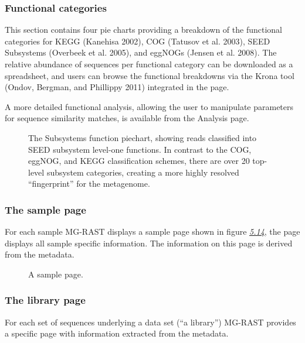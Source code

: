 \documentclass[letterpaper,10pt,english]{sphinxmanual}
\begin{document}
\subsubsection{Functional categories}
\label{\detokenize{user_manual:functional-categories}}
This section contains four pie charts providing a breakdown of the
functional categories for KEGG (Kanehisa 2002), COG (Tatusov et al.
2003), SEED Subsystems (Overbeek et al. 2005), and eggNOGs (Jensen et
al. 2008). The relative abundance of sequences per functional category
can be downloaded as a spreadsheet, and users can browse the functional
breakdowns via the Krona tool (Ondov, Bergman, and Phillippy 2011)
integrated in the page.

A more detailed functional analysis, allowing the user to manipulate
parameters for sequence similarity matches, is available from the
Analysis page.

\begin{figure}[htbp]
\centering
\capstart

\noindent{}
\caption{The Subsystems function piechart, showing reads classified into SEED
subsystem level-one functions. In contrast to the COG, eggNOG, and
KEGG classification schemes, there are over 20 top-level subsystem
categories, creating a more highly resolved “fingerprint” for the
metagenome.}\label{\detokenize{user_manual:fig-subsystems-functions-piechart}}\end{figure}


\subsubsection{The sample page}
\label{\detokenize{user_manual:the-sample-page}}
For each sample MG-RAST displays a sample page shown in figure
{\hyperref[\detokenize{user_manual:fig:v4-sample-page}]{\emph{5.14}}}, the page displays all sample specific
information. The information on this page is derived from the metadata.

\begin{figure}[htbp]
\centering
\capstart

\noindent{}
\caption{A sample page.}\label{\detokenize{user_manual:fig-v4-sample-page}}\end{figure}


\subsubsection{The library page}
\label{\detokenize{user_manual:the-library-page}}
For each set of sequences underlying a data set (“a library”) MG-RAST
provides a specific page with information extracted from the metadata.
\end{document}
